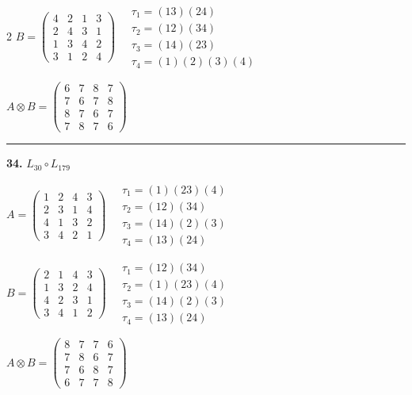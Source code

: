 \begin{multicols}{2}
$B = \begin{pmatrix} 4 & 2 & 1 & 3 \\ 2 & 4 & 3 & 1 \\ 1 & 3 & 4 & 2 \\ 3 & 1 & 2 & 4 \end{pmatrix} \quad \begin{matrix} \tau_{1}=(1 3)(2 4) \\ \tau_{2}=(1 2)(3 4) \\ \tau_{3}=(1 4)(2 3) \\ \tau_{4}=(1)(2)(3)(4) \end{matrix}$

$A \otimes B = \begin{pmatrix} 6 & 7 & 8 & 7 \\ 7 & 6 & 7 & 8 \\ 8 & 7 & 6 & 7 \\ 7 & 8 & 7 & 6 \end{pmatrix}$

\vspace{0.3em}
\hrule
\vspace{0.3em}

\noindent\textbf{34.} $L_{30} \circ L_{179}$

$A = \begin{pmatrix} 1 & 2 & 4 & 3 \\ 2 & 3 & 1 & 4 \\ 4 & 1 & 3 & 2 \\ 3 & 4 & 2 & 1 \end{pmatrix} \quad \begin{matrix} \tau_{1}=(1)(2 3)(4) \\ \tau_{2}=(1 2)(3 4) \\ \tau_{3}=(1 4)(2)(3) \\ \tau_{4}=(1 3)(2 4) \end{matrix}$

$B = \begin{pmatrix} 2 & 1 & 4 & 3 \\ 1 & 3 & 2 & 4 \\ 4 & 2 & 3 & 1 \\ 3 & 4 & 1 & 2 \end{pmatrix} \quad \begin{matrix} \tau_{1}=(1 2)(3 4) \\ \tau_{2}=(1)(2 3)(4) \\ \tau_{3}=(1 4)(2)(3) \\ \tau_{4}=(1 3)(2 4) \end{matrix}$

$A \otimes B = \begin{pmatrix} 8 & 7 & 7 & 6 \\ 7 & 8 & 6 & 7 \\ 7 & 6 & 8 & 7 \\ 6 & 7 & 7 & 8 \end{pmatrix}$


\end{multicols}
